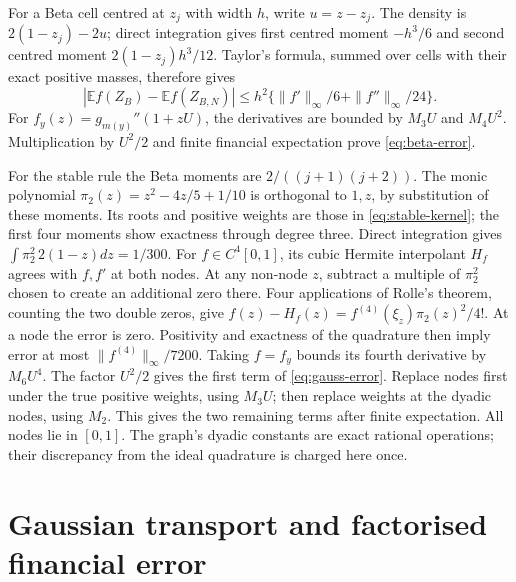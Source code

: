 \documentclass[11pt]{article}
\newcommand{\E}{\mathbb E}
\begin{document}
For a Beta cell centred at $z_j$ with width $h$, write $u=z-z_j$.
The density is $2(1-z_j)-2u$; direct integration gives first centred
moment $-h^3/6$ and second centred moment $2(1-z_j)h^3/12$.
Taylor's formula, summed over cells with their exact positive masses,
therefore gives
\begin{equation}
 |\E f(Z_B)-\E f(Z_{B,N})|
 \leq h^2\{\|f'\|_\infty/6+\|f''\|_\infty/24\}.
\end{equation}
For $f_y(z)=g_{m(y)}''(1+zU)$, the derivatives are bounded by
$M_3U$ and $M_4U^2$. Multiplication by $U^2/2$ and finite financial
expectation prove \eqref{eq:beta-error}.

For the stable rule the Beta moments are $2/((j+1)(j+2))$.
The monic polynomial $\pi_2(z)=z^2-4z/5+1/10$ is orthogonal to
$1,z$, by substitution of these moments. Its roots and positive weights
are those in \eqref{eq:stable-kernel}; the first four moments show
exactness through degree three. Direct integration gives
$\int\pi_2^2\,2(1-z)dz=1/300$.
For $f\in C^4[0,1]$, its cubic Hermite interpolant $H_f$ agrees with
$f,f'$ at both nodes. At any non-node $z$, subtract a multiple of
$\pi_2^2$ chosen to create an additional zero there. Four applications of
Rolle's theorem, counting the two double zeros, give
$f(z)-H_f(z)=f^{(4)}(\xi_z)\pi_2(z)^2/4!$.
At a node the error is zero. Positivity and exactness of the quadrature
then imply error at most $\|f^{(4)}\|_\infty/7200$.
Taking $f=f_y$ bounds its fourth derivative by $M_6U^4$.
The factor $U^2/2$ gives the first term of \eqref{eq:gauss-error}.
Replace nodes first under the true positive weights, using $M_3U$;
then replace weights at the dyadic nodes, using $M_2$. This gives the two
remaining terms after finite expectation. All nodes lie in $[0,1]$.
The graph's dyadic constants are exact rational operations; their discrepancy
from the ideal quadrature is charged here once.

\section{Gaussian transport and factorised financial error}
\label{app:financial-transfer}
\end{document}
